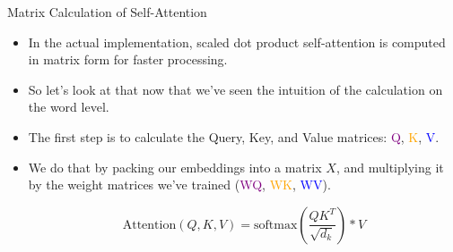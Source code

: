 \documentclass[handout]{beamer}
\begin{document}
\begin{frame}{Matrix Calculation of Self-Attention}
\begin{scriptsize}
\begin{itemize}

\item  In the actual implementation, scaled dot product self-attention is computed in matrix form for faster processing.
\item So let’s look at that now that we’ve seen the intuition of the calculation on the word level.

\item The first step is to calculate the Query, Key, and Value matrices: \textcolor{purple}{Q}, \textcolor{orange}{K}, \textcolor{blue}{V}.

\item We do that by packing our embeddings into a matrix $X$, and multiplying it by the weight matrices we’ve trained (\textcolor{purple}{WQ}, \textcolor{orange}{WK}, \textcolor{blue}{WV}).



 \begin{displaymath}
  \text{Attention}(Q,K,V) = \text{softmax}\left(\frac{QK^T}{\sqrt{d_k}}\right)*V
 \end{displaymath}





\end{itemize}

\end{scriptsize}

\end{frame}
\end{document}
